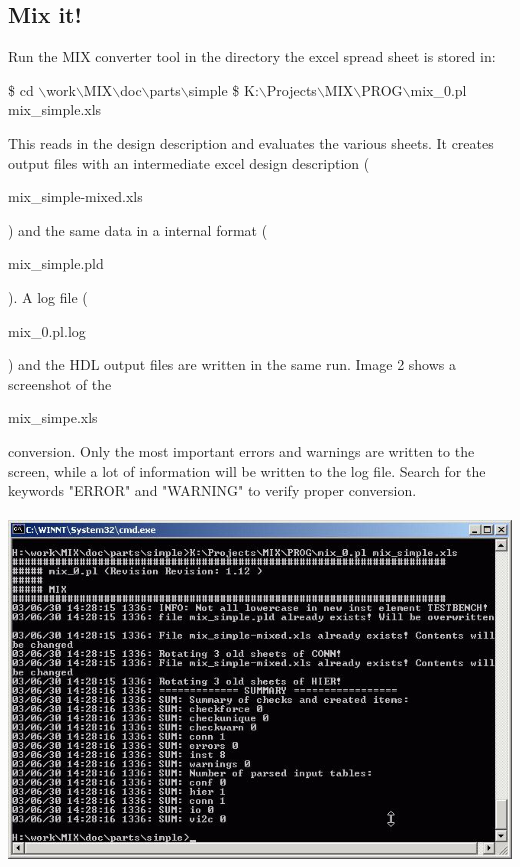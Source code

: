 \documentclass[a4paper,12pt]{article}
\begin{document}
\subsection{Mix it!}
Run the MIX converter tool in the directory the excel spread sheet is stored in:\newline
\begin{tt}\hspace*{15mm}\$ cd $\backslash$work$\backslash$MIX$\backslash$doc$\backslash$parts$\backslash$simple\newline
\hspace*{15mm}\$ K:$\backslash$Projects$\backslash$MIX$\backslash$PROG$\backslash$mix\_0.pl mix\_simple.xls\end{tt}\newline
This reads in the design description and evaluates the various sheets. It creates output files with an intermediate excel design description (\begin{tt}mix\_simple-mixed.xls\end{tt}) and the same data in a internal format (\begin{tt}mix\_simple.pld\end{tt}). A log file (\begin{tt}mix\_0.pl.log\end{tt}) and the HDL output files are written in the same run. Image 2 shows a screenshot of the \begin{tt}mix\_simpe.xls\end{tt} conversion. Only the most important errors and warnings are written to the screen, while a lot of information will be written to the log file. Search for the keywords "ERROR" and "WARNING" to verify proper conversion.\\
\\
\includegraphics[scale=0.6]{images/mix_simple_cmd.jpg}\\
\end{document}
